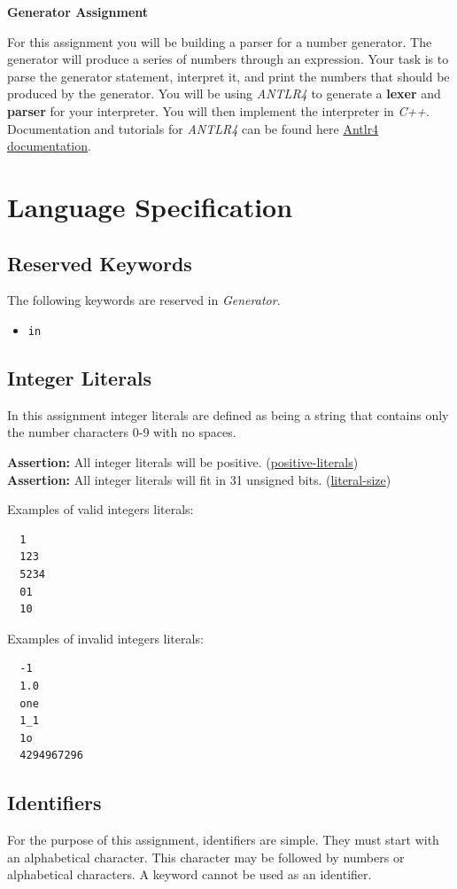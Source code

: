 \documentclass{article}
\newcommand{\code}[1]{\texttt{\textmd{#1}}}
\newcommand{\assertion}[2]{\textbf{Assertion: }#1 (\hyperlink{#2}{#2})}
\begin{document}
\ifpdf
  \LARGE
  \textbf{Generator Assignment}
  \normalsize
\fi

For this assignment you will be building a parser for a number generator. The generator will
produce a series of numbers through an expression. Your task is to parse the generator statement,
interpret it, and print the numbers that should be produced by the generator. You will be using
\textit{ANTLR4} to generate a \textbf{lexer} and \textbf{parser} for your interpreter. You will
then implement the interpreter in \textit{C++}. Documentation and tutorials for \textit{ANTLR4} can
be found here \href{https://github.com/antlr/antlr4/blob/master/doc/index.md}
{Antlr4 documentation}.

\section{Language Specification}
\subsection{Reserved Keywords}
The following keywords are reserved in \textit{Generator}.
\begin{itemize}
  \item \code{in}
\end{itemize}

\subsection{Integer Literals}
In this assignment integer literals are defined as being a string that contains only the number
characters 0-9 with no spaces.

\assertion{All integer literals will be positive.}{positive-literals}\\
\assertion{All integer literals will fit in 31 unsigned bits.}{literal-size}

Examples of valid integers literals:
\begin{lstlisting}
  1
  123
  5234
  01
  10
\end{lstlisting}

Examples of invalid integers literals:
\begin{lstlisting}
  -1
  1.0
  one
  1_1
  1o
  4294967296
\end{lstlisting}

\subsection{Identifiers}
For the purpose of this assignment, identifiers are simple. They must start with an alphabetical
character. This character may be followed by numbers or alphabetical characters. A keyword cannot
be used as an identifier.
\end{document}

